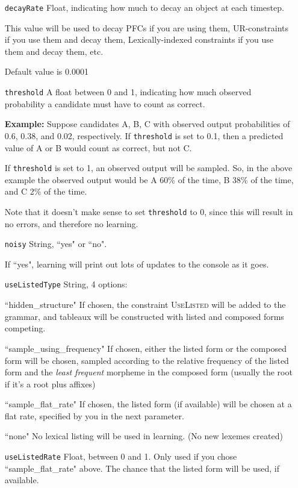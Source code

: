\documentclass[12]{article}
\begin{document}
\begin{itemize}
	\item[\texttt{decayRate}] Float, indicating how much to decay an object at each timestep.
	
	This value will be used to decay PFCs if you are using them, UR-constraints if you use them and decay them, Lexically-indexed constraints if you use them and decay them, etc.
	
	Default value is 0.0001
	
	\item[\texttt{threshold}] A float between 0 and 1, indicating how much observed probability a candidate must have to count as correct.
	
	{\bf Example:} Suppose candidates A, B, C with observed output probabilities of 0.6, 0.38, and 0.02, respectively.  If \texttt{threshold} is set to 0.1, then a predicted value of A or B would count as correct, but not C.
	
	If \texttt{threshold} is set to 1, an observed output will be sampled.  So, in the above example the observed output would be A 60\% of the time, B 38\% of the time, and C 2\% of the time.
	
	Note that it doesn't make sense to set \texttt{threshold} to 0, since this will result in no errors, and therefore no learning.
	
	\item[\texttt{noisy}]  String, ``yes" or ``no".
	
	If ``yes", learning will print out lots of updates to the console as it goes.
	
	\item[\texttt{useListedType}] String, 4 options:
	
	``hidden\_structure"  If chosen, the constraint \textsc{UseListed} will be added to the grammar, and tableaux will be constructed with listed and composed forms competing.
	
	``sample\_using\_frequency"  If chosen, either the listed form or the composed form will be chosen, sampled according to the relative frequency of the listed form and the {\it least frequent} morpheme in the composed form (usually the root if it's a root plus affixes)
	
	``sample\_flat\_rate"  If chosen, the listed form (if available) will be chosen at a flat rate, specified by you in the next parameter.
	
	``none"  No lexical listing will be used in learning.  (No new lexemes created)
	
	\item[\texttt{useListedRate}] Float, between 0 and 1.  Only used if you chose ``sample\_flat\_rate" above.  The chance that the listed form will be used, if available.
	

\end{itemize}
\end{document}
